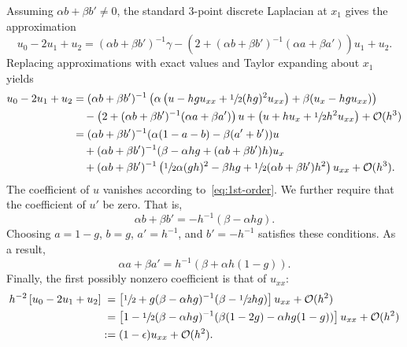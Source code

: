 Assuming $\alpha b + \beta b' \neq 0$, the standard 3-point discrete Laplacian at $x_1$
gives the approximation
\begin{equation}
    \label{eq:1d-3ptl}
    u_0 - 2u_1 + u_2
    = (\alpha b + \beta b')^{-1}\gamma - \left(2 + (\alpha b + \beta b')^{-1}(\alpha a + \beta a')\right)u_1 + u_2.
\end{equation}
Replacing approximations with exact values and Taylor expanding about $x_1$ yields
\begin{equation}
    \label{eq:1d-3ptl-expanded}
    \begin{aligned}
        u_0 - 2u_1 + u_2
        &= (\alpha b + \beta b')^{-1}\left(\alpha\left(u-hgu_{xx} + \sfrac12(hg)^2 u_{xx}\right) + \beta(u_x - hgu_{xx})\right) \\
        &\quad -\left(2+(\alpha b+\beta b')^{-1}(\alpha a + \beta a')\right)u + \left(u + hu_x + \sfrac12 h^2u_{xx}\right) + \mathcal{O}(h^3) \\
        &= (\alpha b + \beta b')^{-1}(\alpha(1-a-b) - \beta(a'+b'))u \\
        &\quad +(\alpha b + \beta b')^{-1}(\beta - \alpha hg + (\alpha b + \beta b')h)u_x \\
        &\quad +(\alpha b + \beta b')^{-1}\left(\sfrac12\alpha(gh)^2-\beta hg +\sfrac12(\alpha b + \beta b')h^2\right)u_{xx} + \mathcal{O}(h^3).
    \end{aligned}
\end{equation}
The coefficient of $u$ vanishes according to~\eqref{eq:1st-order}. We further require
that the coefficient of $u'$ be zero. That is,
\begin{equation*}
    \alpha b + \beta b' = -h^{-1}(\beta-\alpha hg).
\end{equation*}
Choosing $a=1-g$, $b=g$, $a'=h^{-1}$, and $b'=-h^{-1}$ satisfies these conditions. As a
result,
\begin{equation*}
    \alpha a + \beta a' = h^{-1}(\beta + \alpha h(1-g)).
\end{equation*}
Finally, the first possibly nonzero coefficient is that of $u_{xx}$:
\begin{equation}
    \begin{aligned}
        h^{-2}\left[u_0 - 2u_1 + u_2\right]
        &\hphantom{:}= \left[\sfrac12 + g(\beta-\alpha hg)^{-1}(\beta-\sfrac12 hg)\right]u_{xx} + \mathcal{O}(h^2) \\
        &\hphantom{:}= \left[1-\sfrac12(\beta-\alpha hg)^{-1}(\beta(1-2g)-\alpha hg(1-g))\right]u_{xx} + \mathcal{O}(h^2) \\
        &:= (1-\epsilon)u_{xx} + \mathcal{O}(h^2).
    \end{aligned}
    \label{eq:lap-error}
\end{equation}
